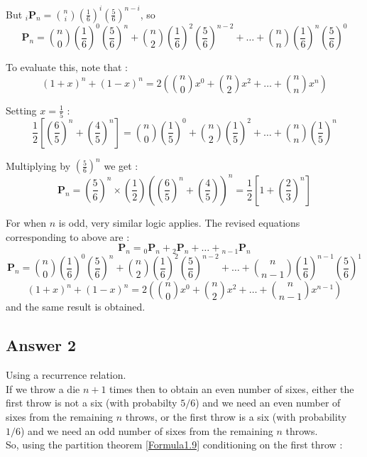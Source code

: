 But ${}_i\mathbf{P}_n = \binom{n}{i} \left(\frac{1}{6}\right)^i \left(\frac{5}{6}\right)^{n-i}  $, so
\begin{equation*} 
\mathbf{P}_n = \binom{n}{0} \left(\frac{1}{6}\right)^0 \left(\frac{5}{6}\right)^{n} + 
\binom{n}{2} \left(\frac{1}{6}\right)^2 \left(\frac{5}{6}\right)^{n-2} + \ldots + \binom{n}{n} \left(\frac{1}{6}\right)^n \left(\frac{5}{6}\right)^{0}
\end{equation*}

To evaluate this, note that : 
\begin{equation*} 
\left(1+x\right)^n + \left(1-x\right)^n = 2\left(\binom{n}{0}x^0 + \binom{n}{2}x^2 + \ldots + \binom{n}{n}x^n\right)
\end{equation*} 

Setting $x = \frac{1}{5}$ :
\begin{equation*} 
\frac{1}{2}\left[\left(\frac{6}{5}\right)^n + \left(\frac{4}{5}\right)^n \right] = 
\binom{n}{0}\left(\frac{1}{5}\right)^0 + \binom{n}{2}\left(\frac{1}{5}\right)^2 + \ldots + \binom{n}{n}\left(\frac{1}{5}\right)^n 
\end{equation*} 

Multiplying by $\left(\frac{5}{6}\right)^n$ we get :
\begin{equation*} 
\mathbf{P}_n = \left(\frac{5}{6} \right)^n \times \left(\frac{1}{2} \right) 
\left(\left(\frac{6}{5} \right)^n + \left(\frac{4}{5} \right)\right)^n  
= \frac{1}{2} \left[1 + \left({\frac{2}{3}}\right)^n\right] 
\end{equation*}
 
For when $n$ is odd, very similar logic applies. The revised equations corresponding to above are : 
\begin{equation*} 
\mathbf{P}_n = {}_0\mathbf{P}_n + {}_2\mathbf{P}_n + \ldots + {}_{n-1}\mathbf{P}_n  
\end{equation*}
\begin{equation*} 
\mathbf{P}_n = \binom{n}{0} \left(\frac{1}{6}\right)^0 \left(\frac{5}{6}\right)^{n} + 
\binom{n}{2} \left(\frac{1}{6}\right)^2 \left(\frac{5}{6}\right)^{n-2} + \ldots + \binom{n}{n-1} \left(\frac{1}{6}\right)^{n-1} \left(\frac{5}{6}\right)^{1}
\end{equation*}
\begin{equation*} 
\left(1+x\right)^n + \left(1-x\right)^n = 2\left(\binom{n}{0}x^0 + \binom{n}{2}x^2 + \ldots + \binom{n}{n-1}x^{n-1}\right) 
\end{equation*} 
and the same result is obtained.

\subsection{Answer 2}
Using a recurrence relation. \\
If we throw a die $n+1$ times then to obtain an even number of sixes, either the first throw is not a six (with probabilty $5/6$) and we need an 
even number of sixes from the remaining $n$ throws, or the first throw is a six (with probability $1/6$) 
and we need an odd number of sixes from the remaining $n$ throws.
\\
So, using the partition theorem \eqref{Formula1.9} conditioning on the first throw :

